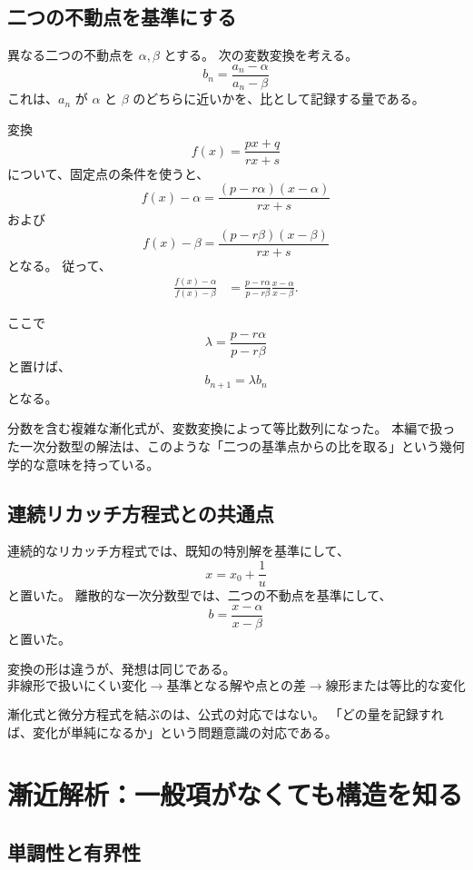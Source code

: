 \subsection{二つの不動点を基準にする}

異なる二つの不動点を $\alpha,\beta$ とする。
次の変数変換を考える。
\[
  b_n=\frac{a_n-\alpha}{a_n-\beta}
\]
これは、$a_n$ が $\alpha$ と $\beta$ のどちらに近いかを、比として記録する量である。

変換
\[
  f(x)=\frac{px+q}{rx+s}
\]
について、固定点の条件を使うと、
\[
  f(x)-\alpha
  =
  \frac{(p-r\alpha)(x-\alpha)}{rx+s}
\]
および
\[
  f(x)-\beta
  =
  \frac{(p-r\beta)(x-\beta)}{rx+s}
\]
となる。
従って、
\[
\begin{aligned}
  \frac{f(x)-\alpha}{f(x)-\beta}
  &=
  \frac{p-r\alpha}{p-r\beta}
  \frac{x-\alpha}{x-\beta}.
\end{aligned}
\]

ここで
\[
  \lambda=\frac{p-r\alpha}{p-r\beta}
\]
と置けば、
\[
  b_{n+1}=\lambda b_n
\]
となる。

分数を含む複雑な漸化式が、変数変換によって等比数列になった。
本編で扱った一次分数型の解法は、このような「二つの基準点からの比を取る」という幾何学的な意味を持っている。

\subsection{連続リカッチ方程式との共通点}

連続的なリカッチ方程式では、既知の特別解を基準にして、
\[
  x=x_0+\frac1u
\]
と置いた。
離散的な一次分数型では、二つの不動点を基準にして、
\[
  b=\frac{x-\alpha}{x-\beta}
\]
と置いた。

変換の形は違うが、発想は同じである。
\[
  \text{非線形で扱いにくい変化}
  \longrightarrow
  \text{基準となる解や点との差}
  \longrightarrow
  \text{線形または等比的な変化}
\]

漸化式と微分方程式を結ぶのは、公式の対応ではない。
「どの量を記録すれば、変化が単純になるか」という問題意識の対応である。

\section{漸近解析：一般項がなくても構造を知る}

\subsection{単調性と有界性}

